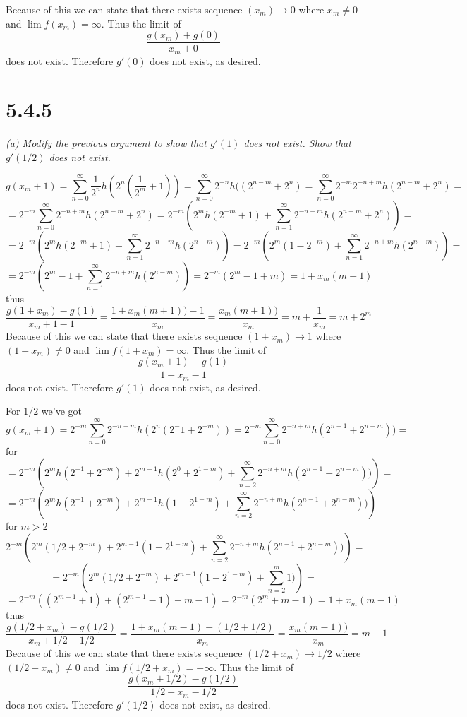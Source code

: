 \documentclass[11pt,oneside,titlepage]{book}
\begin{document}
Because of this we can state that there exists sequence $(x_m) \to 0$
where $x_m \neq 0$ and $\lim{f(x_m) } = \infty$. Thus the limit of 
$$\frac{g(x_m) + g(0)}{x_m + 0}$$
does not exist. Therefore $g'(0)$ does not exist, as desired.

\section*{5.4.5}
\textit{(a) Modify the previous argument to show that $g'(1)$ does not exist.
  Show that $g'(1/2)$ does not exist.}

$$g(x_m + 1) = \sum_{n = 0}^{\infty}{\frac{1}{2^n}h(2^n (\frac{1}{2^m} + 1))}
= 
\sum_{n = 0}^{\infty}{2^{-n}h((2^{n - m} + 2^n)} =
\sum_{n = 0}^{\infty}{2^{-m}2^{-n + m} h(2^{n - m} + 2^n)} =$$
$$ = 2^{-m} \sum_{n = 0}^{\infty}{2^{-n + m} h(2^{n - m} + 2^n)} =
2^{-m} \left(2^m h(2^{-m} + 1) +
  \sum_{n = 1}^{\infty}{2^{-n + m} h(2^{n - m} + 2^n)}\right) = $$
$$ = 2^{-m} \left(2^m h(2^{-m} + 1) +
  \sum_{n = 1}^{\infty}{2^{-n + m} h(2^{n - m} )}\right) =
2^{-m} \left(2^m (1 - 2^{-m}) +
  \sum_{n = 1}^{\infty}{2^{-n + m} h(2^{n - m} )}\right) =
$$
$$
=  2^{-m} \left(2^m - 1 + 
  \sum_{n = 1}^{\infty}{2^{-n + m} h(2^{n - m} )}\right) =
2^{-m} \left(2^m - 1 + m\right) =  1 + x_m(m - 1)
$$
thus
$$\frac{g(1 + x_m) - g(1)}{x_m + 1 - 1} =
\frac{1 + x_m(m + 1)) - 1}{x_m } =
\frac{x_m(m + 1))}{x_m } =
m + \frac{1}{x_m } = m + 2^m$$
Because of this we can state that there exists sequence $(1 + x_m) \to 1$
where $(1 + x_m) \neq 0$ and $\lim{f(1 + x_m) } = \infty$. Thus the limit of 
$$\frac{g(x_m + 1) - g(1)}{1 + x_m - 1}$$
does not exist. Therefore $g'(1)$ does not exist, as desired.

For $1/2$ we've got
$$g(x_m + 1) =
2^{-m}\sum_{n = 0}^{\infty}{2^{-n + m} h(2^{n}(2^-1 + 2^{-m}))} =
2^{-m}\sum_{n = 0}^{\infty}{2^{-n + m} h(2^{n - 1} + 2^{n - m}))} =
$$
for 
$$
=
2^{-m}\left(2^m h(2^{-1} + 2^{-m}) + 2^{m - 1}h(2^0 + 2^{1 - m}) + \sum_{n = 2}^{\infty}{2^{-n + m} h(2^{n - 1} + 2^{n - m}))}\right) =
$$
$$
=
2^{-m}\left(2^m h(2^{-1} + 2^{-m}) + 2^{m - 1}h(1 + 2^{1 - m}) + \sum_{n = 2}^{\infty}{2^{-n + m} h(2^{n - 1} + 2^{n - m}))}\right)
$$
for $m > 2$
$$
2^{-m}\left(2^m (1/2 + 2^{-m}) + 2^{m - 1}(1 - 2^{1 - m}) + \sum_{n = 2}^{\infty}{2^{-n + m} h(2^{n - 1} + 2^{n - m}))}\right) =
$$
$$=
2^{-m}\left(2^m (1/2 + 2^{-m}) + 2^{m - 1}(1 - 2^{1 - m}) + \sum_{n = 2}^{m}{1)}\right) =
$$
$$=
2^{-m}\left((2^{m - 1} + 1) + (2^{m - 1} - 1) + m - 1\right) =
2^{-m}\left(2^{m}  + m - 1\right) = 1 + x_m\left( m - 1\right)
$$
thus
$$\frac{g(1/2 + x_m) - g(1/2)}{x_m + 1/2 - 1/2} =
\frac{1 + x_m( m - 1) - (1/2 + 1/2)}{x_m} =
\frac{x_m(m - 1))}{x_m } =
m - 1$$
Because of this we can state that there exists sequence $(1/2 + x_m) \to 1/2$
where $(1/2 + x_m) \neq 0$ and $\lim{f(1/2 + x_m) } = -\infty$.
Thus the limit of 
$$\frac{g(x_m + 1/2) - g(1/2)}{1/2 + x_m - 1/2}$$
does not exist. Therefore $g'(1/2)$ does not exist, as desired.
\end{document}

